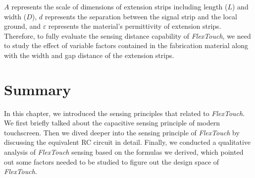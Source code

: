 $A$ represents the scale of dimensions of extension strips including length ($L$) and width ($D$), $d$ represents the separation between the signal strip and the local ground, and $\varepsilon$ represents the material's permittivity of extension strips. Therefore, to fully evaluate the sensing distance capability of \textit{FlexTouch}, we need to study the effect of variable factors contained in the fabrication material along with the width and gap distance of the extension strips.

\section{Summary}
In this chapter, we introduced the sensing principles that related to \textit{FlexTouch}. We first briefly talked about the capacitive sensing principle of modern touchscreen. Then we dived deeper into the sensing principle of \textit{FlexTouch} by discussing the equivalent RC circuit in detail. Finally, we conducted a qualitative analysis of \textit{FlexTouch} sensing based on the formulas we derived, which pointed out some factors needed to be studied to figure out the design space of \textit{FlexTouch}. 
